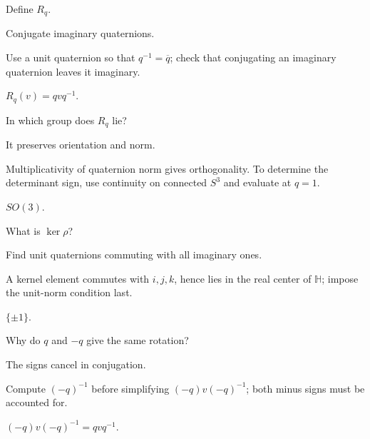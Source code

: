 \begin{exercise}\label{exr:viii13-06}
Define \(R_q\).
\end{exercise}
\begin{hint}
Conjugate imaginary quaternions.

Use a unit quaternion so that \(q^{-1}=\overline q\); check that conjugating an imaginary quaternion leaves it imaginary.
\end{hint}
\begin{solution}
\(R_q(v)=qvq^{-1}\).
\end{solution}

\begin{exercise}\label{exr:viii13-07}
In which group does \(R_q\) lie?
\end{exercise}
\begin{hint}
It preserves orientation and norm.

Multiplicativity of quaternion norm gives orthogonality. To determine the determinant sign, use continuity on connected \(S^3\) and evaluate at \(q=1\).
\end{hint}
\begin{solution}
\(SO(3)\).
\end{solution}

\begin{exercise}\label{exr:viii13-08}
What is \(\ker\rho\)?
\end{exercise}
\begin{hint}
Find unit quaternions commuting with all imaginary ones.

A kernel element commutes with \(i,j,k\), hence lies in the real center of \(\mathbb H\); impose the unit-norm condition last.
\end{hint}
\begin{solution}
\(\{\pm1\}\).
\end{solution}

\begin{exercise}\label{exr:viii13-09}
Why do \(q\) and \(-q\) give the same rotation?
\end{exercise}
\begin{hint}
The signs cancel in conjugation.

Compute \((-q)^{-1}\) before simplifying \((-q)v(-q)^{-1}\); both minus signs must be accounted for.
\end{hint}
\begin{solution}
\((-q)v(-q)^{-1}=qvq^{-1}\).
\end{solution}

